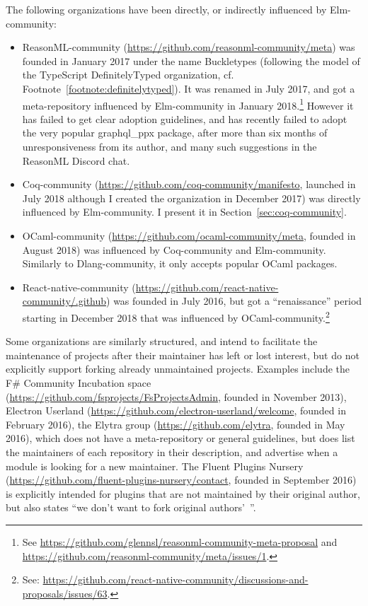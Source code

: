 The following organizations have been directly, or indirectly influenced by Elm-community:
\begin{itemize}
	\item ReasonML-community (\url{https://github.com/reasonml-community/meta}) was founded in January 2017 under the name Buckletypes (following the model of the TypeScript DefinitelyTyped organization, cf. Footnote~\ref{footnote:definitelytyped}).
	It was renamed in July 2017, and got a meta-repository influenced by Elm-community in January 2018.\footnote{
		See \url{https://github.com/glennsl/reasonml-community-meta-proposal} and \url{https://github.com/reasonml-community/meta/issues/1}.
	}
	However it has failed to get clear adoption guidelines, and has recently failed to adopt the very popular graphql\_ppx package, after more than six months of unresponsiveness from its author, and many such suggestions in the ReasonML Discord chat.
	\item Coq-community (\url{https://github.com/coq-community/manifesto}, launched in July 2018 although I created the organization in December 2017) was directly influenced by Elm-community.
	I present it in Section~\ref{sec:coq-community}.
	\item OCaml-community (\url{https://github.com/ocaml-community/meta}, founded in August 2018) was influenced by Coq-community and Elm-community.
	Similarly to Dlang-community, it only accepts popular OCaml packages.
	\item React-native-community (\url{https://github.com/react-native-community/.github}) was founded in July 2016, but got a ``renaissance'' period starting in December 2018 that was influenced by OCaml-community.\footnote{
		See: \url{https://github.com/react-native-community/discussions-and-proposals/issues/63}.
	}
\end{itemize}

Some organizations are similarly structured, and intend to facilitate the maintenance of projects after their maintainer has left or lost interest, but do not explicitly support forking already unmaintained projects.
Examples include the F\# Community Incubation space (\url{https://github.com/fsprojects/FsProjectsAdmin}, founded in November 2013), Electron Userland (\url{https://github.com/electron-userland/welcome}, founded in February 2016), the Elytra group (\url{https://github.com/elytra}, founded in May 2016), which does not have a meta-repository or general guidelines, but does list the maintainers of each repository in their description, and advertise when a module is looking for a new maintainer.
The Fluent Plugins Nursery (\url{https://github.com/fluent-plugins-nursery/contact}, founded in September 2016) is explicitly intended for plugins that are not maintained by their original author, but also states ``we don't want to fork original authors'~''.

